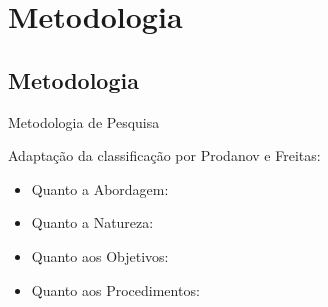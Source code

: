 
\section{Metodologia}
\subsection*{Metodologia}


\begin{frame}{{\sffamily Metodologia de Pesquisa}}
\begin{block}{}
    Adaptação da classificação por Prodanov e Freitas:
    \begin{itemize}
        \item Quanto a Abordagem:
        \item Quanto a Natureza: %
        \item Quanto aos Objetivos: %
        \item Quanto aos Procedimentos: %
    \end{itemize}
\end{block}

\end{frame}

